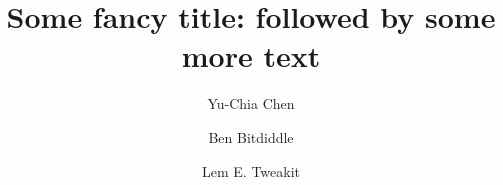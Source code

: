 \usepackage[T1]{fontenc}
\usepackage{lmodern}
\usepackage[size=custom,width=120,height=90,scale=1.0]{beamerposter}
\usepackage{graphicx}
\usepackage{booktabs}
\usepackage{tikz}
\usepackage{pgfplots}
\usepackage{fontawesome}
\usepackage{bm}
\usepackage[ruled]{algorithm2e}
\usepackage{subfig}
\usepackage{wrapfig}
\usepackage{setspace}


\newlength{\sepwidth}
\newlength{\colwidth}
\setlength{\sepwidth}{0.025\paperwidth}
\setlength{\colwidth}{0.3\paperwidth}

\newcommand{\separatorcolumn}{\begin{column}{\sepwidth}\end{column}}



\title{Some fancy title: followed by some more text}

\author{Yu-Chia Chen  \and Ben Bitdiddle  \and Lem E. Tweakit }





